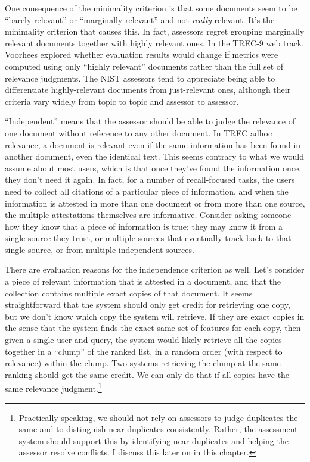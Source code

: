 \documentclass[nobib]{tufte-book}
\begin{document}
One consequence of the minimality criterion is that some documents seem to be ``barely relevant'' or ``marginally relevant'' and not {\em really} relevant.  It's the minimality criterion that causes this. In fact, assessors regret grouping marginally relevant documents together with highly relevant ones.  In the TREC-9 web track, Voorhees explored whether evaluation results would change if metrics were computed using only ``highly relevant'' documents rather than the full set of relevance judgments.  The NIST assessors tend to appreciate being able to differentiate highly-relevant documents from just-relevant ones, although their criteria vary widely from topic to topic and assessor to assessor.\autocite{voorhees_evaluation_2001}

``Independent'' means that the assessor should be able to judge the relevance of one document without reference to any other document.  In TREC adhoc relevance, a document is relevant even if the same information has been found in another document, even the identical text.  This seems contrary to what we would assume about most users, which is that once they've found the information once, they don't need it again.  In fact, for a number of recall-focused tasks, the users need to collect all citations of a particular piece of information, and when the information is attested in more than one document or from more than one source, the multiple attestations themselves are informative.  Consider asking someone how they know that a piece of information is true: they may know it from a single source they trust, or multiple sources that eventually track back to that single source, or from multiple independent sources.

There are evaluation reasons for the independence criterion as well.  Let's consider a piece of relevant information that is attested in a document, and that the collection contains multiple exact copies of that document.  It seems straightforward that the system should only get credit for retrieving one copy, but we don't know which copy the system will retrieve.  If they are exact copies in the sense that the system finds the exact same set of features for each copy, then given a single user and query, the system would likely retrieve all the copies together in a ``clump'' of the ranked list, in a random order (with respect to relevance) within the clump.  Two systems retrieving the clump at the same ranking should get the same credit.  We can only do that if all copies have the same relevance judgment.\footnote{Practically speaking, we should not rely on assessors to judge duplicates the same and to distinguish near-duplicates consistently.  Rather, the assessment system should support this by identifying near-duplicates and helping the assessor resolve conflicts.  I discuss this later on in this chapter.}
\end{document}
